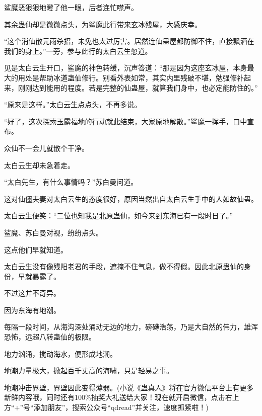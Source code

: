 \begin{this_body}
鲨魔恶狠狠地瞪了他一眼，后者连忙噤声。

其余蛊仙却是微微点头，为鲨魔此行带来玄冰残屋，大感庆幸。

“这个消仙散元雨杀招，未免也太过厉害。居然连仙蛊屋都防御不住，直接飘洒在我们的身上。”一旁，参与此行的太白云生忽道。

见是太白云生开口，鲨魔的神色转缓，沉声答道：“那是因为这座玄冰屋，本身最大的用处是帮助冰道蛊仙修行。别看外表如常，其实内里残破不堪，勉强修补起来，刚刚达到能用的程度。若是完整的仙蛊屋，就算我们身中，也必定能防住的。”

“原来是这样。”太白云生点点头，不再多说。

“好了，这次探索玉露福地的行动就此结束，大家原地解散。”鲨魔一挥手，口中宣布。

众仙不一会儿就散个干净。

太白云生却未急着走。

“太白先生，有什么事情吗？”苏白曼问道。

这对仙僵夫妻对太白云生的态度很好，原因当然出自太白云生手中的人如故仙蛊。

太白云生便笑：“二位也知我是北原蛊仙，如今来到东海已有一段时日了。”

鲨魔、苏白曼对视，纷纷点头。

这点他们早就知道。

太白云生没有像残阳老君的手段，遮掩不住气息，做不得假。因此北原蛊仙的身份，早就暴露了。

不过这并不奇异。

因为东海有地潮。

每隔一段时间，从海沟深处涌动无边的地力，磅礴浩荡，乃是大自然的伟力，雄浑恐怖，远超八转蛊仙的极限。

地力汹涌，搅动海水，便形成地潮。

地潮力量极大，掀起百千丈高的海啸，只是轻易之事。

地潮冲击界壁，界壁因此变得薄弱。(小说《蛊真人》将在官方微信平台上有更多新鲜内容哦，同时还有100\%抽奖大礼送给大家！现在就开启微信，点击右上方“+”号“添加朋友”，搜索公众号“qdread”并关注，速度抓紧啦！)

\end{this_body}

